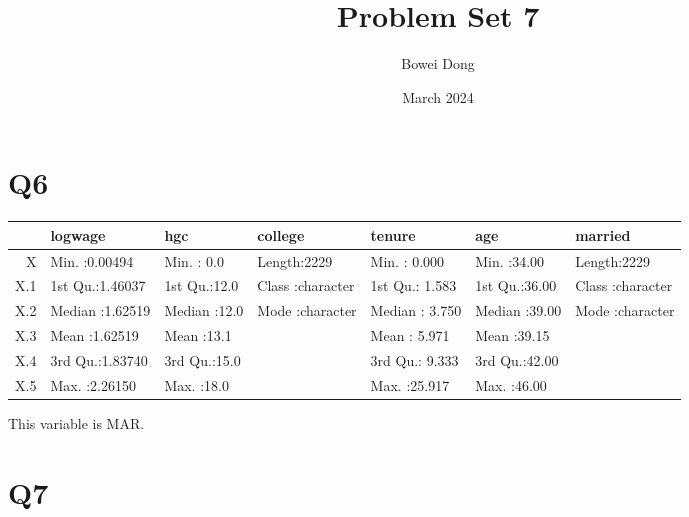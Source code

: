 \documentclass{article}
\title{Problem Set 7}
\author{Bowei Dong }
\date{March 2024}
\begin{document}
\maketitle

\section*{Q6}
\begin{table}[ht]
\centering
\begin{tabular}{rllllll}
  \hline
 &    logwage &      hgc &   college &     tenure &      age &   married \\ 
  \hline
X & Min.   :0.00494   & Min.   : 0.0   & Length:2229        & Min.   : 0.000   & Min.   :34.00   & Length:2229        \\ 
  X.1 & 1st Qu.:1.46037   & 1st Qu.:12.0   & Class :character   & 1st Qu.: 1.583   & 1st Qu.:36.00   & Class :character   \\ 
  X.2 & Median :1.62519   & Median :12.0   & Mode  :character   & Median : 3.750   & Median :39.00   & Mode  :character   \\ 
  X.3 & Mean   :1.62519   & Mean   :13.1   &  & Mean   : 5.971   & Mean   :39.15   &  \\ 
  X.4 & 3rd Qu.:1.83740   & 3rd Qu.:15.0   &  & 3rd Qu.: 9.333   & 3rd Qu.:42.00   &  \\ 
  X.5 & Max.   :2.26150   & Max.   :18.0   &  & Max.   :25.917   & Max.   :46.00   &  \\ 
   \hline
\end{tabular}
\end{table}
This variable is MAR.

\section*{Q7}
\end{document}
